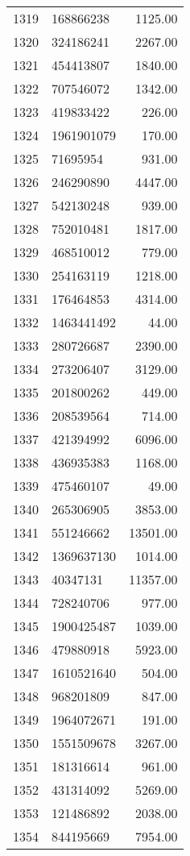 \begin{table}[ht]
\begin{tabular}{rlr}
  1319 & 168866238 & 1125.00 \\ 
  1320 & 324186241 & 2267.00 \\ 
  1321 & 454413807 & 1840.00 \\ 
  1322 & 707546072 & 1342.00 \\ 
  1323 & 419833422 & 226.00 \\ 
  1324 & 1961901079 & 170.00 \\ 
  1325 & 71695954 & 931.00 \\ 
  1326 & 246290890 & 4447.00 \\ 
  1327 & 542130248 & 939.00 \\ 
  1328 & 752010481 & 1817.00 \\ 
  1329 & 468510012 & 779.00 \\ 
  1330 & 254163119 & 1218.00 \\ 
  1331 & 176464853 & 4314.00 \\ 
  1332 & 1463441492 & 44.00 \\ 
  1333 & 280726687 & 2390.00 \\ 
  1334 & 273206407 & 3129.00 \\ 
  1335 & 201800262 & 449.00 \\ 
  1336 & 208539564 & 714.00 \\ 
  1337 & 421394992 & 6096.00 \\ 
  1338 & 436935383 & 1168.00 \\ 
  1339 & 475460107 & 49.00 \\ 
  1340 & 265306905 & 3853.00 \\ 
  1341 & 551246662 & 13501.00 \\ 
  1342 & 1369637130 & 1014.00 \\ 
  1343 & 40347131 & 11357.00 \\ 
  1344 & 728240706 & 977.00 \\ 
  1345 & 1900425487 & 1039.00 \\ 
  1346 & 479880918 & 5923.00 \\ 
  1347 & 1610521640 & 504.00 \\ 
  1348 & 968201809 & 847.00 \\ 
  1349 & 1964072671 & 191.00 \\ 
  1350 & 1551509678 & 3267.00 \\ 
  1351 & 181316614 & 961.00 \\ 
  1352 & 431314092 & 5269.00 \\ 
  1353 & 121486892 & 2038.00 \\ 
  1354 & 844195669 & 7954.00 \\ 

\end{tabular}
\end{table}
